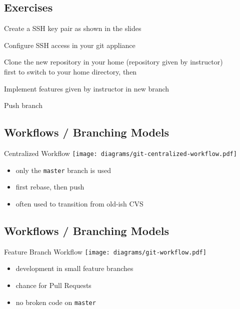 \subsection{Exercises}
\begin{frame}[fragile]
  \subslidetitle
  \begin{exercise}
    \item Create a SSH key pair as shown in the slides
    \item Configure SSH access in your git appliance
    \item Clone the new repository in your home (repository given by instructor)\\
       first to switch to your home directory, then\\
    \item Implement features given by instructor in new branch
    \item Push branch
  \end{exercise}
\end{frame}

\subsection{Workflows / Branching Models}
\begin{frame}[fragile]
  \subslidetitle
  Centralized Workflow
  \center \texttt{[image: diagrams/git-centralized-workflow.pdf]}

  \vspace{2em}
  \begin{itemize}
    \item only the \lstinline{master} branch is used
    \item first rebase, then push
    \item often used to transition from old-ish CVS
  \end{itemize}
\end{frame}

\subsection{Workflows / Branching Models}
\begin{frame}[fragile]
  \subslidetitle
  Feature Branch Workflow
  \center \texttt{[image: diagrams/git-workflow.pdf]}

  \vspace{2em}
  \begin{itemize}
    \item development in small feature branches
    \item chance for Pull Requests
    \item no broken code on \lstinline{master}
  \end{itemize}
\end{frame}

